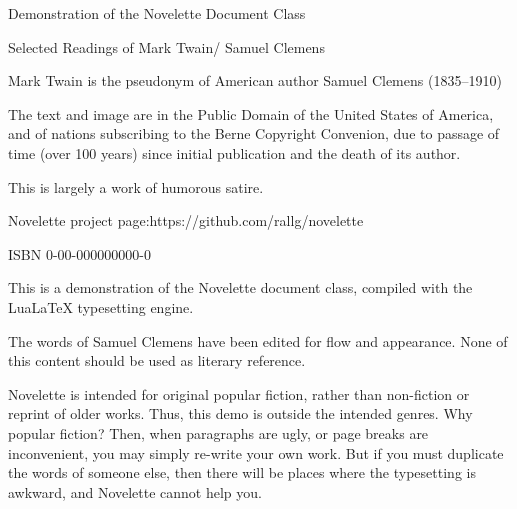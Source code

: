 \documentclass[../interior-demo.tex]{subfiles}
\begin{document}
\begin{fullpage} %
\null\null\null\null\null %
\null\null\null %
\vfill %
{\centering Demonstration of the Novelette Document Class\par}
\end{fullpage}

\begin{copyrightpage}[center] %
\vfill %
Selected Readings of Mark Twain\br/ Samuel Clemens\par
Mark Twain is the pseudonym of American\br
author Samuel Clemens (1835--1910)\par
The text and image are in the Public Domain\br
of the United States of America, and of nations\br
subscribing to the Berne Copyright Convenion,\br
due to passage of time (over 100 years) since\br
initial publication and the death of its author.\par
This is largely a work of humorous satire.\par
Novelette project page:\br https://github.com/rallg/novelette\par
ISBN 0-00-000000000-0\par
\end{copyrightpage}


\begin{fullpage}
\begin{upperpage} %
\null\null\null\null %
\null\null %
\end{upperpage}
\begin{blockindent}[2,2]
\noindent This is a demonstration of the Novelette document
class, compiled with the LuaLaTeX typesetting engine.\par
\null %
\noindent The words of Samuel Clemens
have been edited for flow and appearance. None of this content
should be used as literary reference.\par
\null %
\noindent Novelette is intended for original popular fiction, rather than
non-fiction or reprint of older works. Thus, this demo is outside the intended
genres. Why  popular fiction? Then, when paragraphs are ugly,
or page breaks are inconvenient, you may simply re-write your own work.
But if you must duplicate the words of someone else, then there will be places
where the typesetting is awkward, and Novelette cannot help you.\par 
\end{blockindent}
\end{fullpage}


\blankpage %
\end{document}
